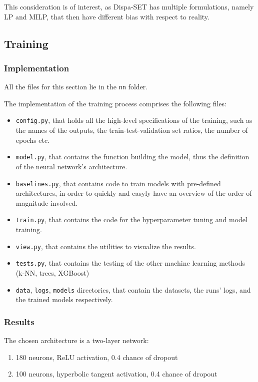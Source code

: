 This consideration is of interest, as Dispa-SET has multiple formulations, namely LP and MILP, that then have different bias with respect to reality.

\subsection{Training}

\subsubsection{Implementation}

All the files for this section lie in the \texttt{nn} folder.

The implementation of the training process comprises the following files:
\begin{itemize}
    \item \texttt{config.py}, that holds all the high-level specifications of the training, such as the names of the outputs, the train-test-validation set ratios, the number of epochs etc.
    \item \texttt{model.py}, that contains the function building the model, thus the definition of the neural network's architecture.
    \item \texttt{baselines.py}, that contains code to train models with pre-defined architectures, in order to quickly and easyly have an overview of the order of magnitude involved.
    \item \texttt{train.py}, that contains the code for the hyperparameter tuning and model training.
    \item \texttt{view.py}, that contains the utilities to visualize the results.
    \item \texttt{tests.py}, that contains the testing of the other machine learning methods (k-NN, trees, XGBoost)
    \item \texttt{data}, \texttt{logs}, \texttt{models} directories, that contain the datasets, the runs' logs, and the trained models respectively.
\end{itemize}

\subsubsection{Results}

The chosen architecture is a two-layer network:
\begin{enumerate}
    \item 180 neurons, ReLU activation, 0.4 chance of dropout
    \item 100 neurons, hyperbolic tangent activation, 0.4 chance of dropout
\end{enumerate}

